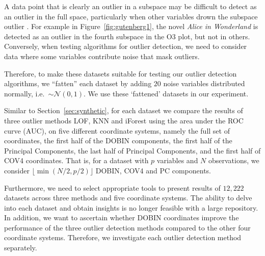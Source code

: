\documentclass[letter,12pt]{article}
\begin{document}

A data point that is clearly an outlier in a subspace may be difficult to detect as an outlier in the full space, particularly when other variables drown the subspace outlier \citep{zimek2012survey}. For example in Figure~\ref{fig:gutenberg1}, the novel \textit{Alice in Wonderland} is detected as an outlier in the fourth subspace in the O3 plot, but not in others.  Conversely, when testing algorithms for outlier detection, we need to consider data where some variables contribute noise that mask outliers.

Therefore, to make these datasets suitable for testing our outlier detection algorithms, we ``fatten'' each dataset by adding $20$ noise variables distributed normally, i.e.\ $\sim \mathcal{N}(0,1)$. We use these `fattened' datasets in our experiment.

Similar to Section~\ref{sec:synthetic}, for each dataset we compare the results of three outlier methods LOF, KNN and iForest using the area under the ROC curve (AUC), on {\color{blue} five} different coordinate systems, namely the full set of coordinates, the first half of the DOBIN components, the first half of the Principal Components, {\color{blue} the last half of Principal Components, and the first half of COV4 coordinates}. That is, for a dataset with $p$ variables and $N$ observations,  we consider $\lfloor\min(N/2, p/2)\rfloor$ DOBIN, {\color{blue} COV4} and PC components.

Furthermore, we need to select appropriate tools to present results of $12,222$ datasets across three methods and {\color{blue}five} coordinate systems. The ability to delve into each dataset and obtain insights is no longer feasible with a large repository. In addition, we want to ascertain whether DOBIN coordinates improve the performance of the three outlier detection methods compared to the other {\color{blue}four} coordinate systems. Therefore, we investigate each outlier detection method separately. 
\end{document}
